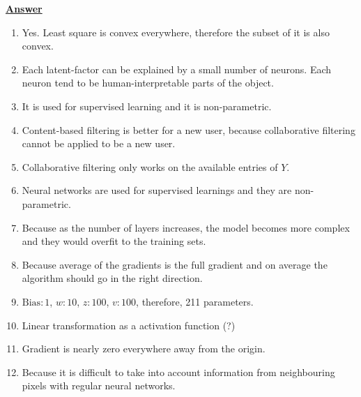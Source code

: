 \documentclass{article}
\def\enum#1{\begin{enumerate}#1\end{enumerate}}
\begin{document}
\underline{\textbf{Answer}}
\enum{
\item Yes. Least square is convex everywhere, therefore the subset of it is also convex.
\item Each latent-factor can be explained by a small number of neurons. Each neuron tend to be human-interpretable parts of the object.  
\item It is used for supervised learning and it is non-parametric.
\item Content-based filtering is better for a new user, because collaborative filtering cannot be applied to be a new user.
\item Collaborative filtering only works on the available entries of $Y$.
\item Neural networks are used for supervised learnings and they are non-parametric.
\item Because as the number of layers increases, the model becomes more complex and they would overfit to the training sets.
\item Because average of the gradients is the full gradient and on average the algorithm should go in the right direction.
\item $\text{Bias}:1$, $w:10$, $z:100$, $v:100$, therefore, 211 parameters.
\item Linear transformation as a activation function (?)
\item Gradient is nearly zero everywhere away from the origin.
\item Because it is difficult to take into account information from neighbouring pixels with regular neural networks.
}
\end{document}
